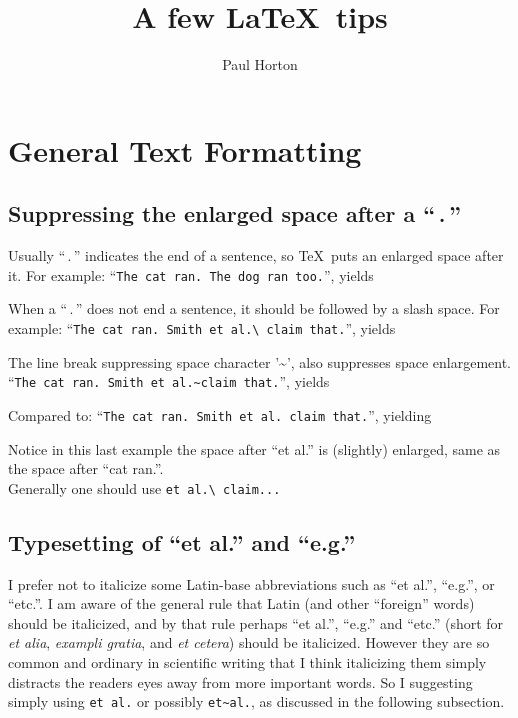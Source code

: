 \documentclass{article}
\title{A few \LaTeX\ tips}
\author{Paul Horton}
\newcommand*\𝚝[1]{\texttt{#1}}%
\begin{document}
\maketitle


\section*{General Text Formatting}
\subsection*{Suppressing the enlarged space after a ``\,.\,''}
Usually ``\,.\,'' indicates the end of a sentence, so \TeX\ puts an enlarged space after it.
For example: ``\𝚝{The cat ran.  The dog ran too.}'', yields
\begin{center}\end{center}
When a ``\,.\,'' does not end a sentence, it should be followed by a slash space.
%
For example: ``\𝚝{The cat ran.  Smith et al.\textbackslash\ claim that.}'', yields
\begin{center}\end{center}
%
The line break suppressing space character '\textasciitilde', also suppresses space enlargement.
``\𝚝{The cat ran.  Smith et al.\textasciitilde claim that.}'', yields
\begin{center}\end{center}
%
Compared to: ``\𝚝{The cat ran.  Smith et al. claim that.}'', yielding
\begin{center}\end{center}
Notice in this last example the space after ``et al.'' is (slightly) enlarged, same as the space after ``cat ran.''.\\
Generally one should use \𝚝{et al.\textbackslash\ claim...}


\subsection*{Typesetting of ``et al.'' and ``e.g.''}
I prefer not to italicize some Latin-base abbreviations such as ``et al.'', ``e.g.'', or ``etc.''.
I am aware of the general rule that Latin (and other ``foreign'' words) should be italicized,
and by that rule perhaps ``et al.'', ``e.g.'' and ``etc.''
(short for \textit{et alia}, \textit{exampli gratia}, and \textit{et cetera}) should be italicized.
However they are so common and ordinary in scientific writing that I think italicizing them
simply distracts the readers eyes away from more important words.
So I suggesting simply using \verb|et al.| or possibly \verb|et~al.|, as discussed in the following subsection.
\end{document}

